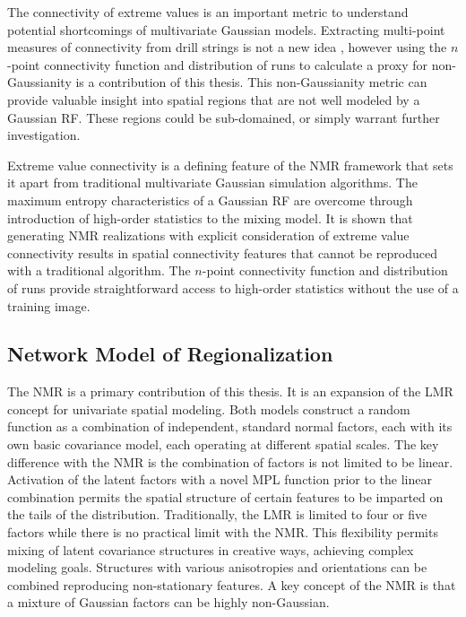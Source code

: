 The connectivity of extreme values is an important metric to understand potential shortcomings of multivariate Gaussian models. Extracting multi-point measures of connectivity from drill strings is not a new idea \citep{ortiz2003characterization,boisvert2007multiplepoint}, however using the $n$-point connectivity function and distribution of runs to calculate a proxy for non-Gaussianity is a contribution of this thesis. This non-Gaussianity metric can provide valuable insight into spatial regions that are not well modeled by a Gaussian \gls{RF}. These regions could be sub-domained, or simply warrant further investigation.

Extreme value connectivity is a defining feature of the \gls{NMR} framework that sets it apart from traditional multivariate Gaussian simulation algorithms. The maximum entropy characteristics of a Gaussian \gls{RF} are overcome through introduction of high-order statistics to the mixing model. It is shown that generating \gls{NMR} realizations with explicit consideration of extreme value connectivity results in spatial connectivity features that cannot be reproduced with a traditional algorithm. The $n$-point connectivity function and distribution of runs provide straightforward access to high-order statistics without the use of a training image.

\subsection{Network Model of Regionalization}
\label{subsec:07nmr}

The \gls{NMR} is a primary contribution of this thesis. It is an expansion of the \gls{LMR} concept for univariate spatial modeling. Both models construct a random function as a combination of independent, standard normal factors, each with its own basic covariance model, each operating at different spatial scales. The key difference with the \gls{NMR} is the combination of factors is not limited to be linear. Activation of the latent factors with a novel \gls{MPL} function prior to the linear combination permits the spatial structure of certain features to be imparted on the tails of the distribution. Traditionally, the \gls{LMR} is limited to four or five factors while there is no practical limit with the \gls{NMR}. This flexibility permits mixing of latent covariance structures in creative ways, achieving complex modeling goals. Structures with various anisotropies and orientations can be combined reproducing non-stationary features. A key concept of the \gls{NMR} is that a mixture of Gaussian factors can be highly non-Gaussian.

